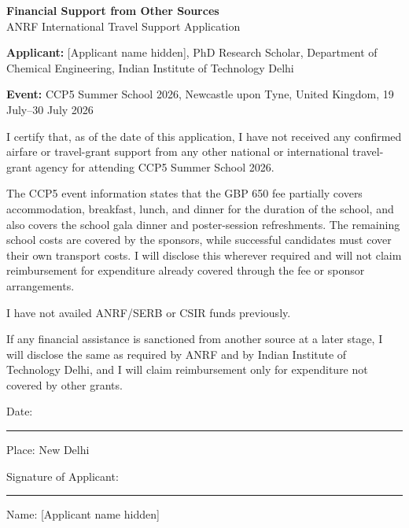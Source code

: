 \documentclass[11pt,a4paper]{article}
\begin{document}
\begin{center}
{\Large \textbf{Financial Support from Other Sources}}\\
{\large ANRF International Travel Support Application}\\[0.5em]
\end{center}

\textbf{Applicant:} [Applicant name hidden], PhD Research Scholar, Department of Chemical Engineering, Indian Institute of Technology Delhi

\textbf{Event:} CCP5 Summer School 2026, Newcastle upon Tyne, United Kingdom, 19 July--30 July 2026

I certify that, as of the date of this application, I have not received any confirmed airfare or travel-grant support from any other national or international travel-grant agency for attending CCP5 Summer School 2026.

The CCP5 event information states that the GBP 650 fee partially covers accommodation, breakfast, lunch, and dinner for the duration of the school, and also covers the school gala dinner and poster-session refreshments. The remaining school costs are covered by the sponsors, while successful candidates must cover their own transport costs. I will disclose this wherever required and will not claim reimbursement for expenditure already covered through the fee or sponsor arrangements.

I have not availed ANRF/SERB or CSIR funds previously.

If any financial assistance is sanctioned from another source at a later stage, I will disclose the same as required by ANRF and by Indian Institute of Technology Delhi, and I will claim reimbursement only for expenditure not covered by other grants.

\vfill

\noindent Date: \rule{0.28\textwidth}{0.4pt}\hfill Place: New Delhi

\vspace{3em}

\noindent Signature of Applicant: \rule{0.42\textwidth}{0.4pt}

\vspace{1em}

\noindent Name: [Applicant name hidden]
\end{document}
